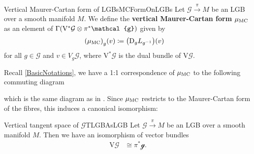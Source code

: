 \documentclass[reqno,a4paper,oneside]{amsart}
\newcommand\MC{\mu_{{\rm MC}}}
\theoremstyle{plain}
\theoremstyle{remark}
\theoremstyle{definition}
\def\bas#1\eas{\begin{align*}#1\end{align*}}
\begin{document}

\begin{definitions}{Vertical Maurer-Cartan form of LGBs}{MCFormOnLGBs}
Let $\mathcal{G} \stackrel{\pi}{\to} M$ be an LGB over a smooth manifold $M$. We define the \textbf{vertical Maurer-Cartan form $\MC$} as an element of $\Gamma\mleft( \mathrm{V}^*\mathcal{G} \otimes \pi^*\mathcal{g} \mright)$ given by
\begin{align*}
\mleft(\MC\mright)_g(v)
&\coloneqq
\mleft( \mathrm{D}_g L_{g^{-1}} \mright)(v)
\end{align*}
for all $g \in \mathcal{G}$ and $v \in V_g\mathcal{G}$,
where $\mathrm{V}^*\mathcal{G}$ is the dual bundle of $\mathrm{V}\mathcal{G}$.
\end{definitions}

Recall \ref{BasicNotations}, we have a 1:1 correspondence of $\MC$ to the following commuting diagram
\begin{center}
\end{center}
which is the same diagram as in \cite[\S 3.5, special situation of Prop.\ 3.5.3, page 121]{mackenzieGeneralTheory}.
Since $\MC$ restricts to the Maurer-Cartan form of the fibres, this induces a canonical isomorphism:

\begin{corollaries}{Vertical tangent space of $\mathcal{G}$}{TLGBAsLGB}
Let $\mathcal{G} \stackrel{\pi}{\to} M$ be an LGB over a smooth manifold $M$. Then we have an isomorphism of vector bundles
\begin{align*}
\mathrm{V}\mathcal{G} &\cong \pi^*\mathcal{g}.
\end{align*}
\end{corollaries}
\end{document}
